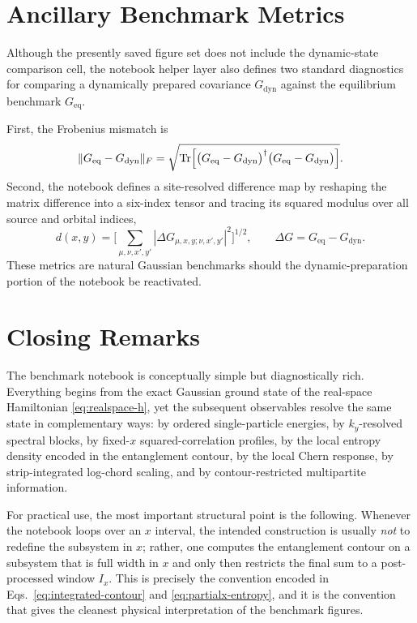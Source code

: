 \documentclass[aps,prb,onecolumn,nofootinbib]{revtex4-2}
\newcommand{\Ix}{I_x}
\begin{document}
\section{Ancillary Benchmark Metrics}
Although the presently saved figure set does not include the dynamic-state
comparison cell, the notebook helper layer also defines two standard diagnostics
for comparing a dynamically prepared covariance $G_{\mathrm{dyn}}$ against the
equilibrium benchmark $G_{\mathrm{eq}}$.

First, the Frobenius mismatch is
\begin{equation}
\|G_{\mathrm{eq}} - G_{\mathrm{dyn}}\|_F
=
\sqrt{
\operatorname{Tr}
\Bigl[
\bigl(G_{\mathrm{eq}} - G_{\mathrm{dyn}}\bigr)^{\dagger}
\bigl(G_{\mathrm{eq}} - G_{\mathrm{dyn}}\bigr)
\Bigr]
}.
\label{eq:frob}
\end{equation}
Second, the notebook defines a site-resolved difference map by reshaping the
matrix difference into a six-index tensor and tracing its squared modulus over
all source and orbital indices,
\begin{equation}
d(x,y)
=
\Biggl[
\sum_{\mu,\nu,x',y'}
\left|
\Delta G_{\mu,x,y;\nu,x',y'}
\right|^2
\Biggr]^{1/2},
\qquad
\Delta G = G_{\mathrm{eq}} - G_{\mathrm{dyn}}.
\label{eq:site-diff}
\end{equation}
These metrics are natural Gaussian benchmarks should the dynamic-preparation
portion of the notebook be reactivated.

\section{Closing Remarks}
The benchmark notebook is conceptually simple but diagnostically rich.
Everything begins from the exact Gaussian ground state of the real-space
Hamiltonian \eqref{eq:realspace-h}, yet the subsequent observables resolve the
same state in complementary ways: by ordered single-particle energies, by
$k_y$-resolved spectral blocks, by fixed-$x$ squared-correlation profiles, by
the local entropy density encoded in the entanglement contour, by the local
Chern response, by strip-integrated log-chord scaling, and by
contour-restricted multipartite information.

For practical use, the most important structural point is the following.
Whenever the notebook loops over an $x$ interval, the intended construction is
usually \emph{not} to redefine the subsystem in $x$; rather, one computes the
entanglement contour on a subsystem that is full width in $x$ and only then
restricts the final sum to a post-processed window $\Ix$.  This is precisely the
convention encoded in Eqs.~\eqref{eq:integrated-contour} and
\eqref{eq:partialx-entropy}, and it is the convention that gives the cleanest
physical interpretation of the benchmark figures.
\end{document}

